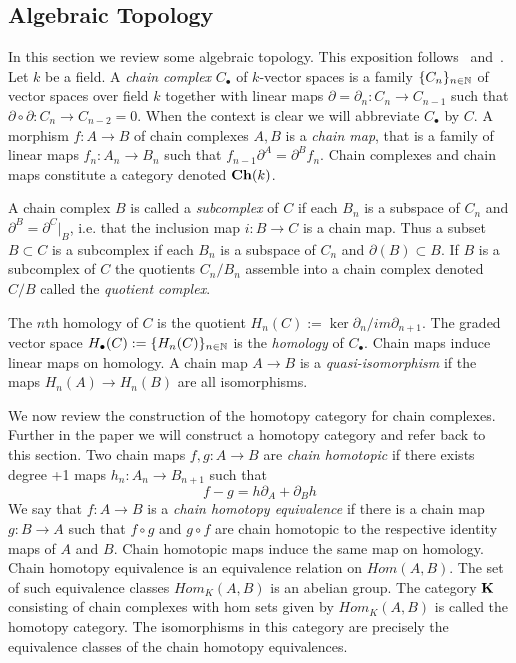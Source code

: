 \subsection{Algebraic Topology}\label{sec:prelims:AT}

In this section we review some algebraic topology.  This exposition follows~\cite{weibel} and~\cite{gelfand}.  Let $k$ be a field.  A {\em chain complex} $C_\bullet$ of $k$-vector spaces is a family $\{C_n\}_{n\in {\mathbb{N}}}$ of vector spaces over field $k$ together with linear maps $\partial=\partial_n:C_n\to C_{n-1}$ such that $\partial\circ\partial: C_n\to C_{n-2}=0$.  When the context is clear we will abbreviate $C_\bullet$ by $C$.  A morphism $f:A\to B$ of chain complexes $A,B$ is a {\em chain map}, that is a family of linear maps $f_n:A_n\to B_n$ such that $f_{n-1}\partial^A = \partial^B f_n$. Chain complexes and chain maps constitute a category denoted ${\bf Ch}(k)$.  

A chain complex $B$ is called a {\em subcomplex} of $C$ if each $B_n$ is a subspace of $C_n$ and $\partial^B= \partial^C|_B$, i.e. that the inclusion map $i:B\to C$ is a chain map.  Thus a subset $B\subset C$ is a subcomplex if each $B_n$ is a subspace of $C_n$ and $\partial( B)\subset B$.  If $B$ is a subcomplex of $C$ the quotients $C_n/B_n$ assemble into a chain complex denoted $C/B$ called the {\em quotient complex}.   

 The $n$th homology of $C$ is the quotient $H_n(C):= \ker \partial_n/im \partial_{n+1}$.  The graded vector space $H_\bullet(C) := \{H_n(C)\}_{n\in {\mathbb{N}}}$ is the {\em homology} of $C_\bullet$.  Chain maps induce linear maps on homology.  A chain map $A\to B$ is a {\em quasi-isomorphism} if the maps $H_n(A)\to H_n(B)$ are all isomorphisms.

We now review the construction of the homotopy category for chain complexes.  Further in the paper we will construct a homotopy category and refer back to this section.  Two chain maps $f,g:A\to B$ are {\em chain homotopic} if there exists degree +1 maps $h_n:A_n\to B_{n+1}$ such that $$f-g = h\partial_A+\partial_Bh$$  We say that $f:A\to B$ is a {\em chain homotopy equivalence} if there is a chain map $g:B\to A$ such that $f\circ g$ and $g\circ f$ are chain homotopic to the respective identity maps of $A$ and $B$. Chain homotopic maps induce the same map on homology.   Chain homotopy equivalence is an equivalence relation on $Hom(A,B)$.  The set of such equivalence classes $Hom_K(A,B)$ is an abelian group.  The category ${\bf K}$ consisting of chain complexes with hom sets given by $Hom_K(A,B)$ is called the homotopy category.  The isomorphisms in this category are precisely the equivalence classes of the chain homotopy equivalences.

